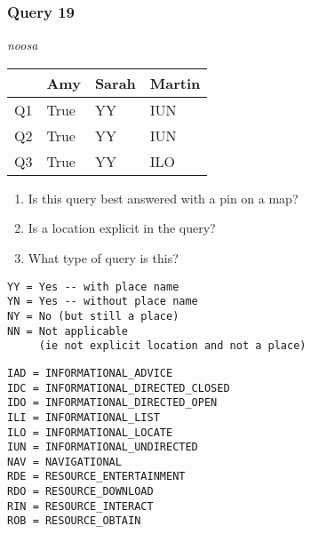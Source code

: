 \begin{frame}[fragile]
\frametitle{Query 19}
\vspace{1em}

\emph{noosa}

\vfill

\begin{table}
  \centering
  \begin{tabular}{ l l l l }
    & \textbf{Amy} & \textbf{Sarah} & \textbf{Martin}\\
    \toprule
    Q1 & True & YY & IUN\\
Q2 & True & YY & IUN\\
Q3 & True & YY & ILO\\
    \bottomrule
  \end{tabular}
\end{table}

\vfill

\tiny{

\begin{enumerate}
\item Is this query best answered with a pin on a map?
\item Is a location explicit in the query?
\item What type of query is this?
\end{enumerate}

\vfill

\begin{multicols}{2}
\begin{verbatim}
YY = Yes -- with place name
YN = Yes -- without place name
NY = No (but still a place)
NN = Not applicable 
     (ie not explicit location and not a place)
\end{verbatim}

\columnbreak
\begin{verbatim}
IAD = INFORMATIONAL_ADVICE
IDC = INFORMATIONAL_DIRECTED_CLOSED
IDO = INFORMATIONAL_DIRECTED_OPEN
ILI = INFORMATIONAL_LIST
ILO = INFORMATIONAL_LOCATE
IUN = INFORMATIONAL_UNDIRECTED
NAV = NAVIGATIONAL
RDE = RESOURCE_ENTERTAINMENT
RDO = RESOURCE_DOWNLOAD
RIN = RESOURCE_INTERACT
ROB = RESOURCE_OBTAIN
\end{verbatim}
\end{multicols}
}

\end{frame}



